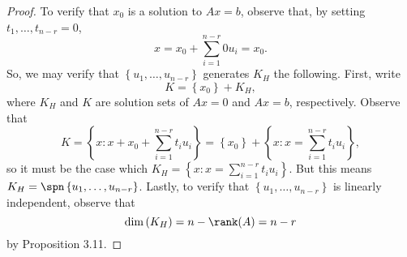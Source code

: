 \documentclass[linearalgebra]{subfiles}
\begin{document}
    \begin{proof}
        To verify that $x_0$ is a solution to $Ax=b$, observe that, by setting $t_1, \ldots, t_{n-r} = 0$,
        \begin{equation*}
            x = x_0 + \sum^{n-r}_{i=1} 0u_i = x_0.
        \end{equation*}
        So, we may verify that $\left\lbrace u_1, \ldots, u_{n-r} \right\rbrace$ generates $K_H$ the following. First, write
        \begin{equation*}
            K = \left\lbrace x_0 \right\rbrace + K_H,
        \end{equation*}
        where $K_H$ and $K$ are solution sets of $Ax=0$ and $Ax=b$, respectively. Observe that
        \begin{equation*}
            K = \left\lbrace x: x + x_0 + \sum^{n-r}_{i=1} t_iu_i \right\rbrace = \left\lbrace x_0 \right\rbrace + \left\lbrace x: x=\sum^{n-r}_{i=1} t_iu_i \right\rbrace,
        \end{equation*}
        so it must be the case which $K_H = \left\lbrace x: x=\sum^{n-r}_{i=1} t_iu_i \right\rbrace$. But this means $K_H = \spn \left\lbrace u_1, \ldots, u_{n-r} \right\rbrace$. Lastly, to verify that $\left\lbrace u_1, \ldots, u_{n-r} \right\rbrace$ is linearly independent, observe that
        \begin{equation*}
            \dim\left( K_H \right)  = n-\rank(A) = n-r
        \end{equation*}
        by Proposition 3.11.
    \end{proof}
\end{document}
